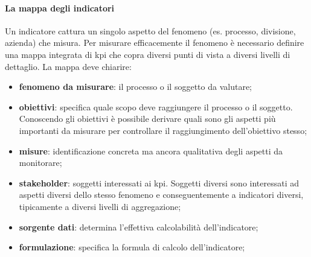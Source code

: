 \paragraph{La mappa degli indicatori}\label{par:kpi_la_mappa_degli_indicatori} %
Un indicatore cattura un singolo aspetto del fenomeno (es. processo, divisione, azienda) che misura.
Per misurare efficacemente il fenomeno è necessario definire una mappa integrata di \ac{kpi} che copra diversi punti di vista a diversi livelli di dettaglio.
La mappa deve chiarire:
\begin{itemize}
    \item \textbf{fenomeno da misurare}: il processo o il soggetto da valutare;
    \item \textbf{obiettivi}: specifica quale scopo deve raggiungere il processo o il soggetto.
        Conoscendo gli obiettivi è possibile derivare quali sono gli aspetti più importanti da misurare per controllare il raggiungimento dell'obiettivo stesso;
    \item \textbf{misure}: identificazione concreta ma ancora qualitativa degli aspetti da monitorare;
    \item \textbf{stakeholder}: soggetti interessati ai \ac{kpi}.
        Soggetti diversi sono interessati ad aspetti diversi dello stesso fenomeno e conseguentemente a indicatori diversi, tipicamente a diversi livelli di aggregazione;
    \item \textbf{sorgente dati}: determina l'effettiva calcolabilità dell'indicatore;
    \item \textbf{formulazione}: specifica la formula di calcolo dell'indicatore;
\end{itemize}
%
